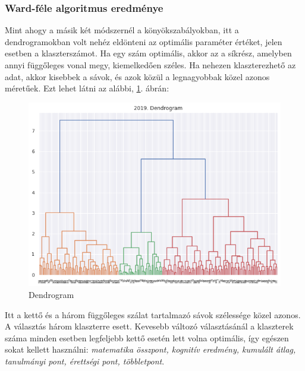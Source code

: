 \documentclass[12pt]{article}
\begin{document}
\subsubsection{Ward-féle algoritmus eredménye}

Mint ahogy a másik két módszernél a könyökszabályokban, itt a dendrogramokban volt nehéz eldönteni az optimális paraméter értéket, jelen esetben a klaszterszámot. Ha egy szám optimális, akkor az a síkrész, amelyben annyi függőleges vonal megy, kiemelkedően széles. Ha nehezen klaszterezhető az adat, akkor kisebbek a sávok, és azok közül a legnagyobbak közel azonos méretűek. Ezt lehet látni az alábbi, \ref{fig:dendrogram}. ábrán:

\begin{figure}[H]
\centering
\includegraphics[width = \textwidth]{kepek/dendrogram.png}
\caption{Dendrogram}
\label{fig:dendrogram}
\end{figure}

Itt a kettő és a három függőleges szálat tartalmazó sávok szélessége közel azonos. A választás három klaszterre esett. Kevesebb változó választásánál a klaszterek száma minden esetben legfeljebb kettő esetén lett volna optimális, így egészen sokat kellett használni: \textit{matematika összpont, kognitív eredmény, kumulált átlag, tanulmányi pont, érettségi pont, többletpont}.
\end{document}

